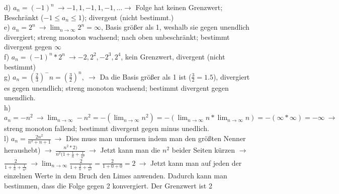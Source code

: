\documentclass{article}
\begin{document}
	d) $a_n=(-1)^n\ \to -1, 1, -1, 1, -1, ... \to$ Folge hat keinen Grenzwert; Beschränkt ($-1\leq a_n \leq 1$); divergent (nicht bestimmt.) \\
	e) $a_n=2^n\ \to \lim_{n\to\infty}2^n=\infty$, Basis größer als 1, weshalb sie gegen unendlich divergiert; streng monoton wachsend; nach oben unbeschränkt; bestimmt divergent gegen $\infty$ \\
	f) $a_n=(-1)^n*2^n\ \to -2, 2^2, -2^3, 2^4$, kein Grenzwert, divergent (nicht bestimmt) \\
	g) $a_n=(\frac{2}{3})^-n=(\frac{3}{2})^n,\ \to$ Da die Basis größer als 1 ist ($\frac{3}{2}=1.5$), divergiert es gegen unendlich; streng monoton wachsend; bestimmt divergent gegen unendlich. \\
	h) $a_n=-n^2\ \to \lim_{n\to\infty}-n^2=-(\lim_{n\to\infty}n^2)=-(\lim_{n\to\infty}n*\lim_{n\to\infty}n)=-(\infty*\infty)=-\infty\ \to$ streng monoton fallend; bestimmt divergent gegen minus unedlich. \\
	l) $a_n=\frac{2n^2}{n^2+n+1}\ \to$ Dies muss man umformen indem man den größten Nenner heraushebt) $\to\ \frac{n^2*2)}{n^2(1+\frac{1}{n}+\frac{1}{n^2}}\ \to$ Jetzt kann man die $n^2$ beider Seiten kürzen $\to$ \\
	$\frac{2}{1+\frac{1}{n}+\frac{1}{n^2}}\ \to \lim_{n\to\infty}\frac{2}{1+\frac{1}{n}+\frac{1}{n^2}}=\frac{2}{1+0+0}=2\ \to$ Jetzt kann man auf jeden der einzelnen Werte in dem Bruch den Limes anwenden. Dadurch kann man bestimmen, dass die Folge gegen 2 konvergiert. Der Grenzwert ist 2

	








	 
\end{document}
